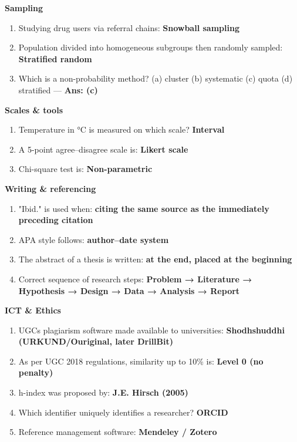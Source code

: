 \textbf{Sampling}

\begin{enumerate}
\def\labelenumi{\arabic{enumi}.}
\setcounter{enumi}{10}
\tightlist
\item
  Studying drug users via referral chains: \textbf{Snowball sampling}
\item
  Population divided into homogeneous subgroups then randomly sampled: \textbf{Stratified random}
\item
  Which is a non-probability method? (a) cluster (b) systematic (c) quota (d) stratified --- \textbf{Ans: (c)}
\end{enumerate}

\textbf{Scales \& tools}

\begin{enumerate}
\def\labelenumi{\arabic{enumi}.}
\setcounter{enumi}{13}
\tightlist
\item
  Temperature in °C is measured on which scale? \textbf{Interval}
\item
  A 5-point agree--disagree scale is: \textbf{Likert scale}
\item
  Chi-square test is: \textbf{Non-parametric}
\end{enumerate}

\textbf{Writing \& referencing}

\begin{enumerate}
\def\labelenumi{\arabic{enumi}.}
\setcounter{enumi}{16}
\tightlist
\item
  "Ibid." is used when: \textbf{citing the same source as the immediately preceding citation}
\item
  APA style follows: \textbf{author--date system}
\item
  The abstract of a thesis is written: \textbf{at the end, placed at the beginning}
\item
  Correct sequence of research steps: \textbf{Problem → Literature → Hypothesis → Design → Data → Analysis → Report}
\end{enumerate}

\textbf{ICT \& Ethics}

\begin{enumerate}
\def\labelenumi{\arabic{enumi}.}
\setcounter{enumi}{20}
\tightlist
\item
  UGC\textquotesingle s plagiarism software made available to universities: \textbf{Shodhshuddhi (URKUND/Ouriginal, later DrillBit)}
\item
  As per UGC 2018 regulations, similarity up to 10\% is: \textbf{Level 0 (no penalty)}
\item
  h-index was proposed by: \textbf{J.E. Hirsch (2005)}
\item
  Which identifier uniquely identifies a researcher? \textbf{ORCID}
\item
  Reference management software: \textbf{Mendeley / Zotero}
\end{enumerate}

